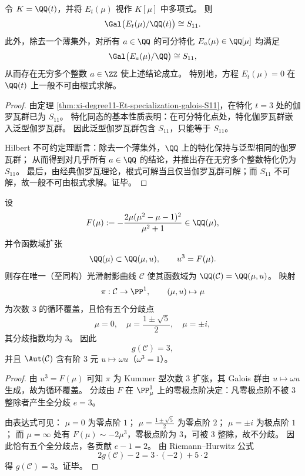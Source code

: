 \begin{corollary}\label{cor:xi-degree11-Et-generic-galois-S11-hilbert}
令 \(K=\QQ(t)\)，并将 \(E_t(\mu)\) 视作 \(K[\mu]\) 中多项式。
则
\[
\Gal\bigl(E_t(\mu)/\QQ(t)\bigr)\cong S_{11}.
\]
此外，除去一个薄集外，对所有 \(a\in\QQ\) 的可分特化 \(E_a(\mu)\in\QQ[\mu]\) 均满足
\[
\Gal\bigl(E_a(\mu)/\QQ\bigr)\cong S_{11},
\]
从而存在无穷多个整数 \(a\in\ZZ\) 使上述结论成立。
特别地，方程 \(E_t(\mu)=0\) 在 \(\QQ(t)\) 上一般不可由根式求解。
\end{corollary}
\begin{proof}
由定理 \ref{thm:xi-degree11-Et-specialization-galois-S11}，在特化 \(t=3\) 处的伽罗瓦群已为 \(S_{11}\)。
特化同态的基本性质表明：在可分特化点处，特化伽罗瓦群嵌入泛型伽罗瓦群。
因此泛型伽罗瓦群包含 \(S_{11}\)，只能等于 \(S_{11}\)。
\par
Hilbert 不可约定理断言：除去一个薄集外，\(\QQ\) 上的特化保持与泛型相同的伽罗瓦群；
从而得到对几乎所有 \(a\in\QQ\) 的结论，并推出存在无穷多个整数特化仍为 \(S_{11}\)。
最后，由经典伽罗瓦理论，根式可解当且仅当伽罗瓦群可解；而 \(S_{11}\) 不可解，故一般不可由根式求解。证毕。
\end{proof}

\begin{theorem}\label{thm:xi-degree11-cyclic-cubic-normalization-genus3}
设
\[
F(\mu):=-\frac{2\mu(\mu^2-\mu-1)^2}{\mu^2+1}\in\QQ(\mu),
\]
并令函数域扩张
\[
\QQ(\mu)\subset \QQ(\mu,u),\qquad u^3=F(\mu).
\]
则存在唯一（至同构）光滑射影曲线 \(\mathcal C\) 使其函数域为 \(\QQ(\mathcal C)=\QQ(\mu,u)\)。
映射
\[
\pi:\mathcal C\to\PP^1,\qquad (\mu,u)\mapsto \mu
\]
为次数 \(3\) 的循环覆盖，且恰有五个分歧点
\[
\mu=0,\quad \mu=\frac{1\pm\sqrt5}{2},\quad \mu=\pm i,
\]
其分歧指数均为 \(3\)。
因此
\[
g(\mathcal C)=3,
\]
并且 \(\Aut(\mathcal C)\) 含有阶 \(3\) 元 \(u\mapsto \omega u\)（\(\omega^3=1\)）。
\end{theorem}
\begin{proof}
由 \(u^3=F(\mu)\) 可知 \(\pi\) 为 Kummer 型次数 \(3\) 扩张，其 Galois 群由 \(u\mapsto \omega u\) 生成，故为循环覆盖。
分歧由 \(F\) 在 \(\PP^1_\mu\) 上的零极点阶决定：凡零极点阶不被 \(3\) 整除者产生全分歧 \(e=3\)。
\par
由表达式可见：
\(\mu=0\) 为零点阶 \(1\)；
\(\mu=\frac{1\pm\sqrt5}{2}\) 为零点阶 \(2\)；
\(\mu=\pm i\) 为极点阶 \(1\)；
而 \(\mu=\infty\) 处有 \(F(\mu)\sim -2\mu^3\)，零极点阶为 \(3\)，可被 \(3\) 整除，故不分歧。
因此恰有五个全分歧点，各贡献 \(e-1=2\)。
由 Riemann--Hurwitz 公式
\[
2g(\mathcal C)-2=3\cdot(-2)+5\cdot 2
\]
得 \(g(\mathcal C)=3\)。证毕。
\end{proof}


